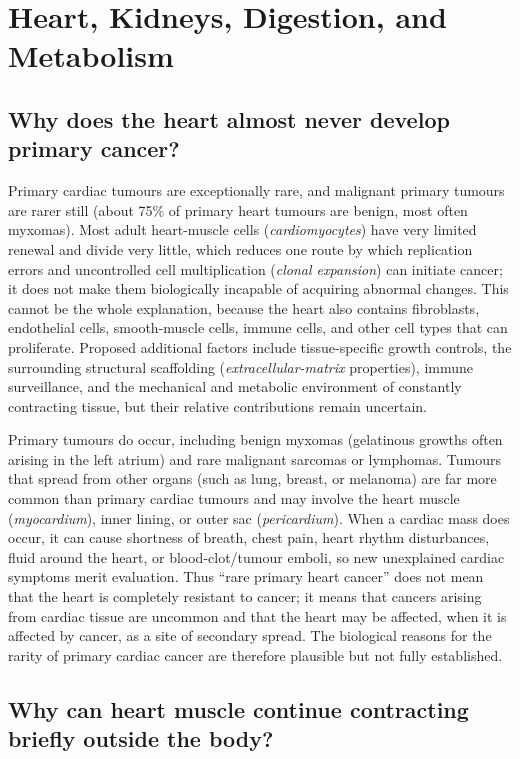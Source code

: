 \documentclass[11pt,oneside]{report}
\begin{document}
\chapter{Heart, Kidneys, Digestion, and Metabolism}

\section{Why does the heart almost never develop primary cancer?}

Primary cardiac tumours are exceptionally rare, and malignant primary tumours
are rarer still (about 75\% of primary heart tumours are benign, most often
myxomas). Most adult heart-muscle cells (\emph{cardiomyocytes}) have very
limited renewal and divide very little, which reduces one route by which
replication errors and uncontrolled cell multiplication (\emph{clonal
expansion}) can initiate cancer; it does not make them biologically incapable
of acquiring abnormal changes. This cannot be the whole explanation, because
the heart also contains fibroblasts, endothelial cells, smooth-muscle cells,
immune cells, and other cell types that can proliferate. Proposed additional
factors include tissue-specific growth controls, the surrounding structural
scaffolding (\emph{extracellular-matrix} properties), immune surveillance, and
the mechanical and metabolic environment of constantly contracting tissue, but
their relative contributions remain uncertain.

Primary tumours do occur, including benign myxomas (gelatinous growths often
arising in the left atrium) and rare malignant sarcomas or lymphomas. Tumours
that spread from other organs (such as lung, breast, or melanoma) are far more
common than primary cardiac tumours and may involve the heart muscle
(\emph{myocardium}), inner lining, or outer sac (\emph{pericardium}). When a
cardiac mass does occur, it can cause shortness of breath, chest pain, heart
rhythm disturbances, fluid around the heart, or blood-clot/tumour emboli, so
new unexplained cardiac symptoms merit evaluation. Thus ``rare primary heart cancer'' does not mean that the heart
is completely resistant to cancer; it means that cancers arising from cardiac
tissue are uncommon and that the heart may be affected, when it is affected by
cancer, as a site of secondary spread. The biological reasons for the rarity
of primary cardiac cancer are therefore plausible but not fully established.

\section{Why can heart muscle continue contracting briefly outside the body?}
\end{document}
